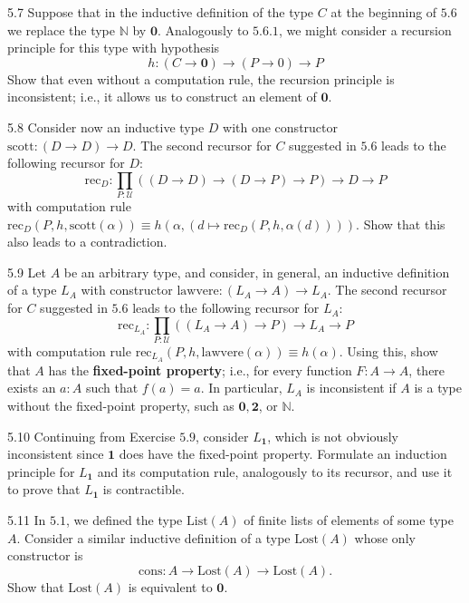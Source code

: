 \documentclass[14pt]{extarticle}
\newcommand{\N}{{\mathbb N}}
\newcommand{\0}{{\mathbf 0}}
\newcommand{\1}{{\mathbf 1}}
\newcommand{\2}{{\mathbf 2}}
\newcommand{\UU}{{\mathcal U}}
\newcommand{\mt}{\mapsto}
\newcommand{\rec}{\mathrm{rec}}
\newcommand{\cons}{\mathrm{cons}}
\newcommand{\List}{\mathrm{List}}
\newcommand{\Lost}{\mathrm{Lost}}
\begin{document}
\begin{prob}{5.7}{} Suppose that in the inductive definition of the type $C$ at the beginning of $5.6$ we replace the type $\N$ by $\0$. Analogously to $5.6.1$, we might consider a recursion principle for this type with hypothesis \[h : (C \to \0) \to (P \to 0) \to P\]
Show that even without a computation rule, the recursion principle is inconsistent; i.e., it allows us to construct an element of $\0$.
\end{prob}

\begin{prob}{5.8}{} Consider now an inductive type $D$ with one constructor $\text{scott} : (D \to D) \to D$. The second recursor for $C$ suggested in $5.6$ leads to the following recursor for $D$:
\[\rec_D : \prod_{P : \UU}((D \to D) \to (D \to P) \to P) \to D \to P\] with computation rule $\rec_D(P,h,\text{scott}(\alpha)) \equiv h(\alpha,(d \mt \rec_D(P,h,\alpha(d))))$. Show that this also leads to a contradiction.
\end{prob}

\begin{prob}{5.9}{} Let $A$ be an arbitrary type, and consider, in general, an inductive definition of a type $L_A$ with constructor $\text{lawvere} : (L_A \to A) \to L_A$. The second recursor for $C$ suggested in $5.6$ leads to the following recursor for $L_A$: \[\rec_{L_A} : \prod_{P : \UU}((L_A \to A) \to P) \to L_A \to P\] with computation rule $\rec_{L_A}(P,h, \text{lawvere}(\alpha)) \equiv h(\alpha)$. Using this, show that $A$ has the \textbf{fixed-point property}; i.e., for every function $F : A \to A$, there exists an $a : A$ such that $f(a) = a$. In particular, $L_A$ is inconsistent if $A$ is a type without the fixed-point property, such as $\0,\2$, or $\N$.
\end{prob}

\begin{prob}{5.10}{} Continuing from Exercise $5.9$, consider $L_\1$, which is not obviously inconsistent since $\1$ does have the fixed-point property. Formulate an induction principle for $L_\1$ and its computation rule, analogously to its recursor, and use it to prove that $L_\1$ is contractible.
\end{prob}

\begin{prob}{5.11}{} In $5.1$, we defined the type $\List(A)$ of finite lists of elements of some type $A$. Consider a similar inductive definition of a type $\Lost(A)$ whose only constructor is \[\cons : A \to \Lost(A) \to \Lost(A).\] Show that $\Lost(A)$ is equivalent to $\0$.
\end{prob}
\end{document}
